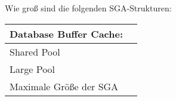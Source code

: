       \item Wie gro\ss{} sind die folgenden SGA-Strukturen:
        \begin{center}
          \begin{small}
            \tabletail{
              \hline
            }
            \tablelasttail {
              \hline
            }
            \begin{supertabular}{|l|p{3cm}|}
            Database Buffer Cache: & \\
            \hline
            Shared Pool & \\
            \hline
            Large Pool & \\
            \hline
            Maximale Gr\"o\ss{}e der SGA & \\
           \end{supertabular}
          \end{small}
        \end{center}
